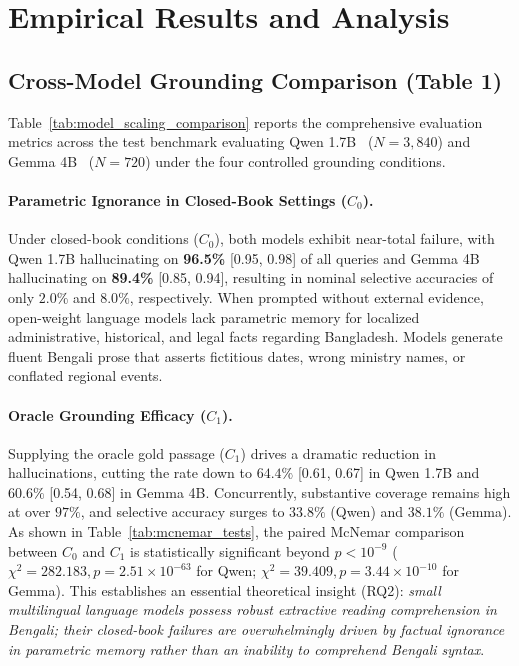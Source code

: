 \section{Empirical Results and Analysis}
\label{sec:results}

\subsection{Cross-Model Grounding Comparison (Table 1)}
Table~\ref{tab:model_scaling_comparison} reports the comprehensive evaluation metrics across the test benchmark evaluating Qwen 1.7B~\citep{qwen2024qwen} ($N=3,840$) and Gemma 4B~\citep{team2024gemma} ($N=720$) under the four controlled grounding conditions.



\paragraph{Parametric Ignorance in Closed-Book Settings ($C_0$).}
Under closed-book conditions ($C_0$), both models exhibit near-total failure, with Qwen 1.7B hallucinating on \textbf{96.5\%} [0.95, 0.98] of all queries and Gemma 4B hallucinating on \textbf{89.4\%} [0.85, 0.94], resulting in nominal selective accuracies of only $2.0\%$ and $8.0\%$, respectively. When prompted without external evidence, open-weight language models lack parametric memory for localized administrative, historical, and legal facts regarding Bangladesh. Models generate fluent Bengali prose that asserts fictitious dates, wrong ministry names, or conflated regional events.

\paragraph{Oracle Grounding Efficacy ($C_1$).}
Supplying the oracle gold passage ($C_1$) drives a dramatic reduction in hallucinations, cutting the rate down to $64.4\%$ [0.61, 0.67] in Qwen 1.7B and $60.6\%$ [0.54, 0.68] in Gemma 4B. Concurrently, substantive coverage remains high at over $97\%$, and selective accuracy surges to $33.8\%$ (Qwen) and $38.1\%$ (Gemma). As shown in Table~\ref{tab:mcnemar_tests}, the paired McNemar comparison between $C_0$ and $C_1$ is statistically significant beyond $p < 10^{-9}$ ($\chi^2 = 282.183, p = 2.51 \times 10^{-63}$ for Qwen; $\chi^2 = 39.409, p = 3.44 \times 10^{-10}$ for Gemma). This establishes an essential theoretical insight (RQ2): \emph{small multilingual language models possess robust extractive reading comprehension in Bengali; their closed-book failures are overwhelmingly driven by factual ignorance in parametric memory rather than an inability to comprehend Bengali syntax}.

